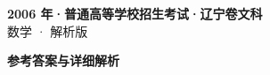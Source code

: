 \documentclass[zihao=-4, a4paper]{ctexart}
\begin{document}
\begin{center}
  {\Large\bfseries 2006 年·普通高等学校招生考试·辽宁卷文科}\\[4pt]
  {\large 数学 · 解析版}
\end{center}
\medskip
{}

\clearpage
{}
\begin{center}{\Large\bfseries 参考答案与详细解析}\end{center}
\medskip

\end{document}
